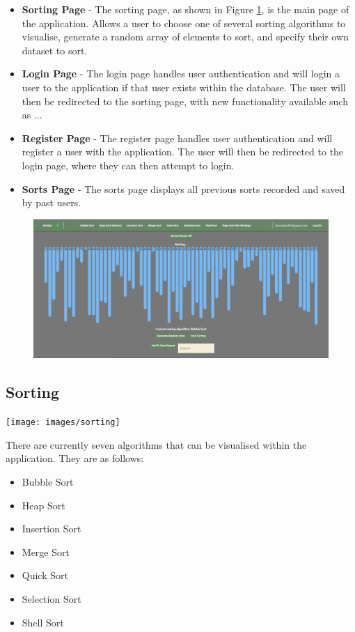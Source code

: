 \begin{itemize}
    \item \textbf{Sorting Page} - The sorting page, as shown in Figure \ref{fig:main_page}, is the main page of the application. Allows a user to choose one of several sorting algorithms to visualise, generate a random array of elements to sort, and specify their own dataset to sort.
    \item \textbf{Login Page} - The login page handles user authentication and will login a user to the application if that user exists within the database. The user will then be redirected to the sorting page, with new functionality available such as ...
    \item \textbf{Register Page} - The register page handles user authentication and will register a user with the application. The user will then be redirected to the login page, where they can then attempt to login.
    \item \textbf{Sorts Page} - The sorts page displays all previous sorts recorded and saved by past users.
\end{itemize}

\begin{figure}[!h]
    \centering
    \includegraphics[scale=.35]{images/web_app_main}
    \label{fig:main_page}
\end{figure}

\subsection{Sorting}
\begin{center}
    \texttt{[image: images/sorting]}
    \label{fig:main_page}
\end{center}

There are currently seven algorithms that can be visualised within the application. They are as follows:

\begin{itemize}
    \item Bubble Sort
    \item Heap Sort
    \item Insertion Sort
    \item Merge Sort
    \item Quick Sort
    \item Selection Sort
    \item Shell Sort
\end{itemize}

